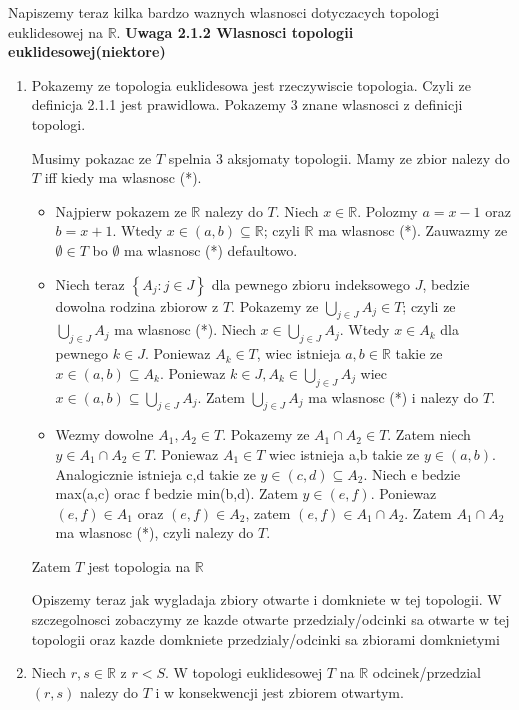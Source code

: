 \documentclass{article}
\begin{document}
Napiszemy teraz kilka bardzo waznych wlasnosci dotyczacych topologi euklidesowej na $\mathbb{R}$.
\textbf{Uwaga 2.1.2 Wlasnosci topologii euklidesowej(niektore)}


\begin{enumerate}[label=(\alph*)] %
    \item Pokazemy ze topologia euklidesowa jest rzeczywiscie topologia. Czyli ze definicja 2.1.1 jest prawidlowa. Pokazemy 3 znane wlasnosci z definicji topologi.

        Musimy pokazac ze $T$ spelnia 3 aksjomaty topologii. Mamy ze zbior nalezy do $T$ iff kiedy ma wlasnosc (*).

        \begin{itemize}
            \item Najpierw pokazem ze $\mathbb{R}$ nalezy do $T$. Niech $x \in \mathbb{R}$. Polozmy $a = x-1$ oraz $b = x+1$. Wtedy $x \in (a,b) \subseteq \mathbb{R}$; czyli $\mathbb{R}$ ma wlasnosc (*). Zauwazmy ze $\emptyset \in T$ bo $\emptyset$ ma wlasnosc (*) defaultowo.

            \item Niech teraz $\left\{ A_{j}: j \in J \right\}$ dla pewnego zbioru indeksowego $J$, bedzie dowolna rodzina zbiorow z $T$. Pokazemy ze $\bigcup\limits_{j \in J}A_{j} \in T$; czyli ze $ \bigcup\limits_{j \in J}A_{j}$ ma wlasnosc (*). Niech $x \in \bigcup\limits_{j \in J}A_{j}$. Wtedy $x \in A_{k}$ dla pewnego $k \in J$. Poniewaz $A_{k} \in T$, wiec istnieja $a,b \in \mathbb{R}$ takie ze $x\in (a,b) \subseteq A_{k}$. Poniewaz $k \in J, A_{k} \in   \bigcup\limits_{j \in J}A_{j}$ wiec $x \in (a,b) \subseteq \bigcup\limits_{j \in J}A_{j} $. Zatem $\bigcup\limits_{j \in J}A_{j}$ ma wlasnosc (*) i nalezy do $T$.

            \item Wezmy dowolne $A_{1}, A_{2} \in T$. Pokazemy ze $A_{1} \cap A_{2} \in T$. Zatem niech $y \in A_{1} \cap A_{2} \in T$. Poniewaz $A_{1} \in T$ wiec istnieja a,b takie ze $y \in (a,b)$. Analogicznie istnieja c,d takie ze $y \in (c,d) \subseteq A_{2}$. Niech e bedzie max(a,c) orac f bedzie min(b,d). Zatem $y \in (e,f)$. Poniewaz $(e,f) \in A_{1}$ oraz $(e,f) \in A_{2}$, zatem $(e,f) \in A_{1} \cap A_{2}$. Zatem $A_{1} \cap A_{2}$ ma wlasnosc (*), czyli nalezy do $T$.
        \end{itemize}
        Zatem $T$ jest topologia na $\mathbb{ R }$

        Opiszemy teraz jak wygladaja zbiory otwarte i domkniete w tej topologii. W szczegolnosci zobaczymy ze kazde otwarte przedzialy/odcinki sa otwarte w tej topologii oraz kazde domkniete przedzialy/odcinki sa zbiorami domknietymi
    \item Niech $r,s \in \mathbb{R}$ z $r<S$. W topologi euklidesowej $T$ na $\mathbb{R}$ odcinek/przedzial $(r,s)$ nalezy do $T$ i w konsekwencji jest zbiorem otwartym.


\end{enumerate}
\end{document}
